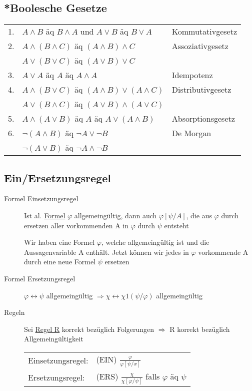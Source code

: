 \documentclass[12pt,a4paper]{article} %
\begin{document}
	\subsection{*Boolesche Gesetze}
	\begin{tabular}{l l l}
		1. & $A \land B$ äq $B \land A$ und $A \lor B$ äq $B \lor A$ & Kommutativgesetz \\
		2. & $A \land(B \land C)$ äq $(A \land B) \land C$ & Assoziativgesetz \\
		& $A \lor (B \lor C)$ äq $(A \lor B) \lor C$ & \\
		3. & $A \lor A$ äq $A$ äq $A \land A$ & Idempotenz \\
		4. & $A \land (B \lor C)$ äq $(A \land B) \lor (A \land C)$ & Distributivgesetz \\
		& $A \lor (B \land C)$ äq $(A \lor B) \land (A \lor C)$ & \\
		5. & $A \land (A \lor B)$ äq $A$ äq $A \lor (A \land B)$ & Absorptionsgesetz \\
		6. & $\neg (A \land B)$ äq $\neg A \lor \neg B$ & De Morgan \\
		& $\neg (A \lor B)$ äq $\neg A \land \neg B$ &
	\end{tabular}

	\subsection{Ein/Ersetzungsregel}
	\begin{description}
		\item[Formel Einsetzungsregel] Ist al. \hyperref[Formel]{Formel} $\varphi$ allgemeingültig, dann auch $\varphi[\psi/A]$, die aus $\varphi$ durch ersetzen aller vorkommenden A in $\varphi$ durch $\psi$ entsteht
		
		Wir haben eine Formel $\varphi$, welche allgemeingültig ist und die Aussagenvariable A enthält. Jetzt können wir jedes in $\varphi$ vorkommende A durch eine neue Formel $\psi$ ersetzen 
		\item[Formel Ersetzungsregel] $\varphi \leftrightarrow \psi$ allgemeingültig $\Rightarrow \chi \leftrightarrow \chi 1(\psi/\varphi)$ allgemeingültig
		\item[Regeln] Sei \hyperref[Kalkul]{Regel R} korrekt bezüglich Folgerungen $\Rightarrow$ R korrekt bezüglich Allgemeingültigkeit
		
		\begin{tabular}{l l}
			Einsetzungsregel: & (EIN) $\frac{\varphi}{\varphi[\psi/x]}$ \\
			Ersetzungsregel: & (ERS) $\frac{\chi}{\chi[\varphi/\psi]}$ falls $\varphi$ äq $\psi$
		\end{tabular}
	\end{description}
		
\end{document}
